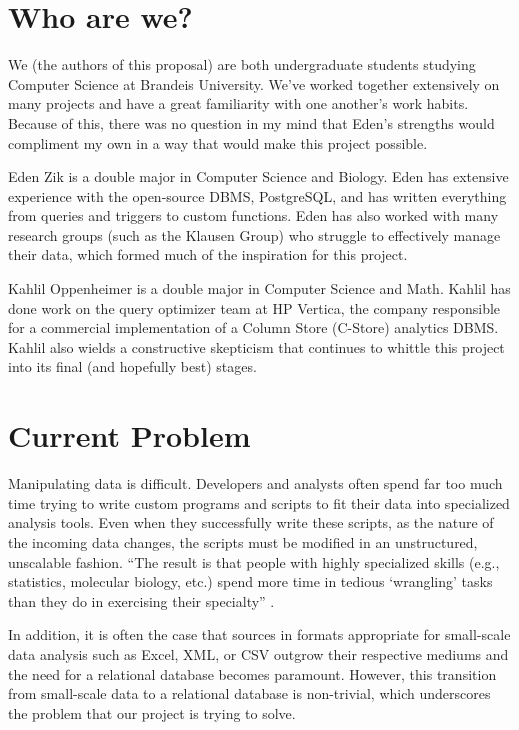 \documentclass{../sty/acm_proc_article-sp}
\begin{document}
\section{Who are we?}

We (the authors of this proposal) are both undergraduate students studying Computer Science at Brandeis University. We've worked together extensively on many projects and have a great familiarity with one another's work habits. Because of this, there was no question in my mind that Eden's strengths would compliment my own in a way that would make this project possible.

Eden Zik is a double major in Computer Science and Biology. Eden has extensive experience with the open-source DBMS, PostgreSQL, and has written everything from queries and triggers to custom functions. Eden has also worked with many research groups (such as the Klausen Group) who struggle to effectively manage their data, which formed much of the inspiration for this project.

Kahlil Oppenheimer is a double major in Computer Science and Math. Kahlil has done work on the query optimizer team at HP Vertica, the company responsible for a commercial implementation of a Column Store (C-Store) analytics DBMS. Kahlil also wields a constructive skepticism that continues to whittle this project into its final (and hopefully best) stages.


\section{Current Problem}
Manipulating data is difficult. Developers and analysts often spend far too much time trying to write custom programs and scripts to fit their data into specialized analysis tools. Even when they successfully write these scripts, as the nature of the incoming data changes, the scripts must be modified in an unstructured, unscalable fashion. ``The result is that people with highly specialized skills (e.g., statistics, molecular biology, etc.) spend more time in tedious `wrangling' tasks than they do in exercising their specialty'' \cite{2011-wrangler}.

In addition, it is often the case that sources in formats appropriate for small-scale data analysis such as Excel, XML, or CSV outgrow their respective mediums and the need for a relational database becomes paramount. However, this transition from small-scale data to a relational database is non-trivial, which underscores the problem that our project is trying to solve.
\end{document}
